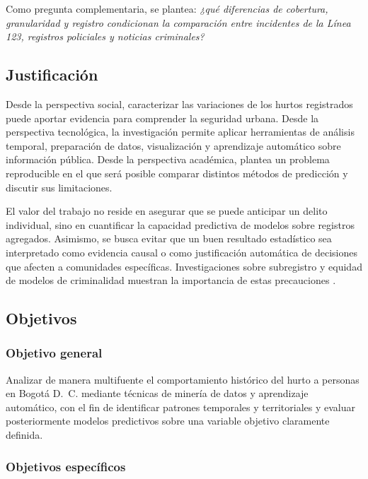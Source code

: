 Como pregunta complementaria, se plantea: \emph{¿qué diferencias de cobertura, granularidad y registro condicionan la comparación entre incidentes de la Línea 123, registros policiales y noticias criminales?}

\subsection{Justificación}

Desde la perspectiva social, caracterizar las variaciones de los hurtos registrados puede aportar evidencia para comprender la seguridad urbana. Desde la perspectiva tecnológica, la investigación permite aplicar herramientas de análisis temporal, preparación de datos, visualización y aprendizaje automático sobre información pública. Desde la perspectiva académica, plantea un problema reproducible en el que será posible comparar distintos métodos de predicción y discutir sus limitaciones.

El valor del trabajo no reside en asegurar que se puede anticipar un delito individual, sino en cuantificar la capacidad predictiva de modelos sobre registros agregados. Asimismo, se busca evitar que un buen resultado estadístico sea interpretado como evidencia causal o como justificación automática de decisiones que afecten a comunidades específicas. Investigaciones sobre subregistro y equidad de modelos de criminalidad muestran la importancia de estas precauciones \citep{riascos2023,urcuqui2020}.

\subsection{Objetivos}

\subsubsection{Objetivo general}

Analizar de manera multifuente el comportamiento histórico del hurto a personas en Bogotá D.~C. mediante técnicas de minería de datos y aprendizaje automático, con el fin de identificar patrones temporales y territoriales y evaluar posteriormente modelos predictivos sobre una variable objetivo claramente definida.

\subsubsection{Objetivos específicos}

